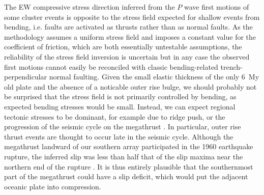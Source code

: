 \documentclass[reviewcopy]{elsart}
\begin{document}
The EW compressive stress direction inferred from the $P$ wave first
motions of some cluster events is opposite to the stress field
expected for shallow events from bending, i.e. faults are activated as thrusts
rather than as normal faults.   As the methodology \citep{robinson00} assumes a uniform stress field and imposes a
constant value for the coefficient of friction, which are both
essentially untestable assumptions, the reliability of the stress
field inversion is uncertain but in any case the observed
first motions cannot easily be reconciled with classic bending-related trench-perpendicular normal
faulting.  Given the small elastic thickness of the only 6~My old
plate and the absence of a noticable outer rise bulge, we should
probably not be surprised that the stress field is not primarily
controlled by bending, as expected bending stresses would be small.
Instead, we can expect regional tectonic stresses to be dominant, for
example due to ridge push, or the progression of the seismic cycle on
the megathrust \citep{christensen88}.  In particular, outer rise thrust
events are thought to occur late in the seismic cycle.  Although the
megathrust landward of our southern array participated in the 1960
earthquake rupture, the inferred slip was less than half that of the slip
maxima near the northern end of the rupture \citep[also see Figure~\ref{fig:overview-map}]{barrientos90}.  It is thus entirely
plausible that the southernmost part of the megathrust could have a slip
deficit, which would put the adjacent oceanic plate into compression. 
\end{document}
